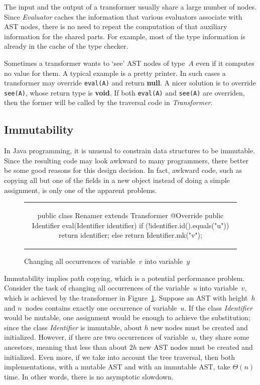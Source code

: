 \documentclass{llncs}
\newcommand{\jmlCode}{\lstinline[style=jml,basicstyle=\normalsize]}
\newcommand{\bc}{\begin{figure}\centering\begin{tabular}{c}} %
\newcommand{\ec}[2]{\end{tabular}\caption{#1}\label{#2}\end{figure}} %
\begin{document}
The input and the output of a transformer usually share a large
number of nodes. Since \textit{Evaluator} caches the information
that various evaluators associate with AST nodes, there is no
need to repeat the computation of that auxiliary information for
the shared parts. For example, most of the type information is
already in the cache of the type checker.

Sometimes a transformer wants to `see' AST nodes of type~$A$
even if it computes no value for them. A typical example is
a pretty printer. In such cases a transformer may override
\jmlCode|eval(A)| and return \textbf{null}. A nicer solution is
to override \jmlCode|see(A)|, whose return type is \textbf{void}.
If both \jmlCode|eval(A)| and \jmlCode|see(A)| are overriden,
then the former will be called by the traversal code in
\textit{Transformer}.

\subsection{Immutability} %
\label{sec:design.immutability}

In Java programming, it is unusual to constrain data structures
to be immutable. Since the resulting code may look awkward to
many programmers, there better be some good reasons for this
design decision. In fact, awkward code, such as copying all but
one of the fields in a new object instead of doing a simple
assignment, is only one of the apparent problems.

\bc
\begin{jml}
public class Renamer extends Transformer {
  @Override public Identifier eval(Identifier identifier) {
    if (!identifier.id().equals("u")) return identifier;
    else return Identifier.mk("v");
  }
}
\end{jml}
\ec{Changing all occurrences of variable~$v$ into variable~$y$}
{lst:example-transformer}

Immutability implies path copying, which is a
potential performance problem. Consider the task of
changing all occurrences of the variable~$u$ into
variable~$v$, which is achieved by the transformer in
Figure~\ref{lst:example-transformer}. Suppose an AST with
height~$h$ and $n$~nodes contains exactly one occurrence of
variable~$u$. If the class \textit{Identifier} would be mutable,
one assignment would be enough to achieve the substitution;
since the class \textit{Identifier} is immutable, about $h$ new
nodes must be created and initialized. However, if there are
two occurrences of variable~$u$, they share some ancestors,
meaning that less than about $2h$ new AST nodes must be created
and initialized. Even more, if we take into account the tree
traversal, then both implementations, with a mutable AST and with
an immutable AST, take $\Theta(n)$ time. In other words, there is
no asymptotic slowdown.
\end{document}

